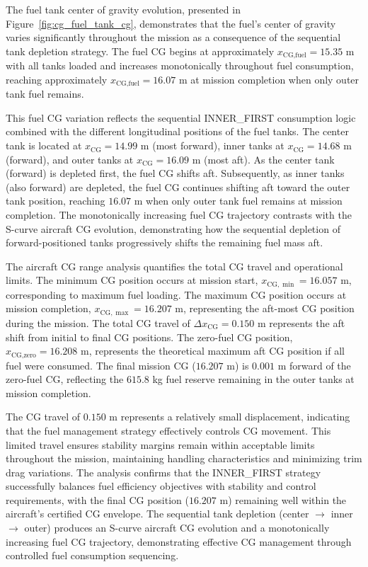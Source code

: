 The fuel tank center of gravity evolution, presented in Figure~\ref{fig:cg_fuel_tank_cg}, demonstrates that the fuel's center of gravity varies significantly throughout the mission as a consequence of the sequential tank depletion strategy. The fuel CG begins at approximately $x_{\text{CG},\text{fuel}} = 15.35$ m with all tanks loaded and increases monotonically throughout fuel consumption, reaching approximately $x_{\text{CG},\text{fuel}} = 16.07$ m at mission completion when only outer tank fuel remains.

This fuel CG variation reflects the sequential INNER\_FIRST consumption logic combined with the different longitudinal positions of the fuel tanks. The center tank is located at $x_{\text{CG}} = 14.99$ m (most forward), inner tanks at $x_{\text{CG}} = 14.68$ m (forward), and outer tanks at $x_{\text{CG}} = 16.09$ m (most aft). As the center tank (forward) is depleted first, the fuel CG shifts aft. Subsequently, as inner tanks (also forward) are depleted, the fuel CG continues shifting aft toward the outer tank position, reaching $16.07$ m when only outer tank fuel remains at mission completion. The monotonically increasing fuel CG trajectory contrasts with the S-curve aircraft CG evolution, demonstrating how the sequential depletion of forward-positioned tanks progressively shifts the remaining fuel mass aft.

The aircraft CG range analysis quantifies the total CG travel and operational limits. The minimum CG position occurs at mission start, $x_{\text{CG},\min} = 16.057$ m, corresponding to maximum fuel loading. The maximum CG position occurs at mission completion, $x_{\text{CG},\max} = 16.207$ m, representing the aft-most CG position during the mission. The total CG travel of $\Delta x_{\text{CG}} = 0.150$ m represents the aft shift from initial to final CG positions. The zero-fuel CG position, $x_{\text{CG},\text{zero}} = 16.208$ m, represents the theoretical maximum aft CG position if all fuel were consumed. The final mission CG ($16.207$ m) is $0.001$ m forward of the zero-fuel CG, reflecting the $615.8$ kg fuel reserve remaining in the outer tanks at mission completion.

The CG travel of $0.150$ m represents a relatively small displacement, indicating that the fuel management strategy effectively controls CG movement. This limited travel ensures stability margins remain within acceptable limits throughout the mission, maintaining handling characteristics and minimizing trim drag variations. The analysis confirms that the INNER\_FIRST strategy successfully balances fuel efficiency objectives with stability and control requirements, with the final CG position ($16.207$ m) remaining well within the aircraft's certified CG envelope. The sequential tank depletion (center $\rightarrow$ inner $\rightarrow$ outer) produces an S-curve aircraft CG evolution and a monotonically increasing fuel CG trajectory, demonstrating effective CG management through controlled fuel consumption sequencing.
